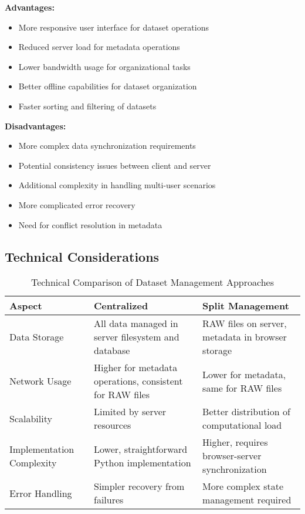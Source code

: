 \textbf{Advantages:}
\begin{itemize}
    \item More responsive user interface for dataset operations
    \item Reduced server load for metadata operations
    \item Lower bandwidth usage for organizational tasks
    \item Better offline capabilities for dataset organization
    \item Faster sorting and filtering of datasets
\end{itemize}

\textbf{Disadvantages:}
\begin{itemize}
    \item More complex data synchronization requirements
    \item Potential consistency issues between client and server
    \item Additional complexity in handling multi-user scenarios
    \item More complicated error recovery
    \item Need for conflict resolution in metadata
\end{itemize}

\subsection{Technical Considerations}

\begin{table}[h]
\centering
\begin{tabular}{|p{3cm}|p{5cm}|p{5cm}|}
\hline
\textbf{Aspect} & \textbf{Centralized} & \textbf{Split Management} \\
\hline
Data Storage & All data managed in server filesystem and database & RAW files on server, metadata in browser storage \\
\hline
Network Usage & Higher for metadata operations, consistent for RAW files & Lower for metadata, same for RAW files \\
\hline
Scalability & Limited by server resources & Better distribution of computational load \\
\hline
Implementation Complexity & Lower, straightforward Python implementation & Higher, requires browser-server synchronization \\
\hline
Error Handling & Simpler recovery from failures & More complex state management required \\
\hline
\end{tabular}
\caption{Technical Comparison of Dataset Management Approaches}
\label{table:dataset_comparison}
\end{table}

